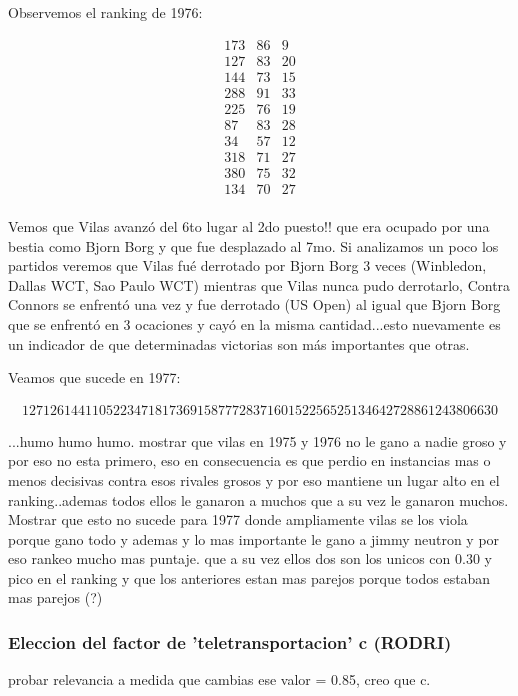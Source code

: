 Observemos el ranking de 1976:

\begin{eqnarray*}
173 & 86 & 9 \\
127 & 83 & 20 \\
144 & 73 & 15 \\
288 & 91 & 33 \\
225 & 76 & 19 \\
87 & 83 & 28 \\
34 & 57 & 12 \\
318 & 71 & 27 \\
380 & 75 & 32 \\
134 & 70 & 27 \\
\end{eqnarray*}


Vemos que Vilas avanzó del 6to lugar al 2do puesto!! que era ocupado por una bestia como Bjorn Borg y que fue desplazado al 7mo. Si analizamos un poco los partidos veremos que Vilas fué derrotado por Bjorn Borg 3 veces (Winbledon, Dallas WCT, Sao Paulo WCT) mientras que Vilas nunca pudo derrotarlo, Contra Connors se enfrentó una vez y fue derrotado (US Open) al igual que Bjorn Borg que se enfrentó en 3 ocaciones y cayó en la misma cantidad...esto nuevamente es un indicador de que determinadas victorias son más importantes que otras.

Veamos que sucede en 1977:

\begin{eqnarray*}
127 126 14 
41 105 22 
34 71 8 
173 69 15 
87 77 28 
371 60 15 
225 65 25 
134 64 27 
288 61 24 
380 66 30 
\end{eqnarray*}


...humo humo humo. mostrar que vilas en 1975 y 1976 no le gano a nadie groso y por eso no esta primero, eso en consecuencia es que perdio en instancias mas o menos decisivas contra esos rivales grosos y por eso mantiene un lugar alto en el ranking..ademas todos ellos le ganaron a muchos que a su vez le ganaron muchos. 
Mostrar que esto no sucede para 1977 donde ampliamente vilas se los viola porque gano todo y ademas y lo mas importante le gano a jimmy neutron y por eso rankeo mucho mas puntaje. que a su vez ellos dos son los unicos con 0.30 y pico en el ranking y que los anteriores estan mas parejos porque todos estaban mas parejos (?) 

\subsubsection{Eleccion del factor de 'teletransportacion' c (RODRI)}
probar relevancia a medida que cambias ese valor = 0.85, creo que c.

